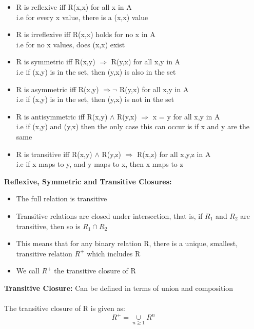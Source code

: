 \documentclass[a4paper,10pt]{article}
\begin{document}
\begin{itemize}
\item R is \textcolor{BlueGreen}{reflexive} iff R(x,x) for all x in A \\
i.e for every x value, there is a (x,x) value 
\item R is \textcolor{BlueGreen}{irreflexive} iff R(x,x) holds for no x in A \\
i.e for no x values, does (x,x) exist
\item R is \textcolor{BlueGreen}{symmetric} iff R(x,y) $\Rightarrow$ R(y,x) for all x,y in A \\
i.e if (x,y) is in the set, then (y,x) is also in the set
\item R is \textcolor{BlueGreen}{asymmetric} iff R(x,y) $\Rightarrow \neg$ R(y,x) for all x,y in A \\ 
i.e if (x,y) is in the set, then (y,x) is not in the set
\item R is \textcolor{BlueGreen}{antisymmetric} iff R(x,y) $\land$ R(y,x) $\Rightarrow$ x = y for all x,y in A \\
i.e if (x,y) and (y,x) then the only case this can occur is if x and y are the same
\item R is \textcolor{BlueGreen}{transitive} iff R(x,y) $\land$ R(y,z) $\Rightarrow$ R(x,z) for all x,y,z in A \\
i.e if x maps to y, and y maps to x, then x maps to z 
\end{itemize}
\textcolor{BlueGreen}{\textbf{Reflexive, Symmetric and Transitive Closures:}} \\
\renewcommand{\labelitemi}{\textperiodcentered}
\begin{itemize}
\item The full relation is transitive 
\item Transitive relations are closed under intersection, that is, if $R_{1}$ and $R_{2}$ are transitive, then so is $R_{1} \cap R_{2}$
\item This means that for any binary relation R, there is a unique, smallest, transitive relation $R^{+}$ which includes R 
\item We call $R^{+}$ the transitive closure of R 
\end{itemize}
\textcolor{BlueGreen}{\textbf{Transitive Closure:}} Can be defined in terms of union and composition\\ \\
The transitive closure of R is given as: 
\begin{equation*}
R^{+} = \underset{n \geq 1}{\cup} R^{n}
\end{equation*}
\end{document}
